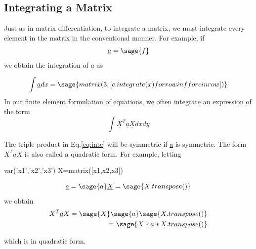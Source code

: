 \documentclass[12pt]{report}
\newcommand{\lab}[1]{
	Eq.\ref{#1}
}
\begin{document}

\subsection{Integrating a Matrix}

Just as in matrix differentiation, to integrate a matrix, we must
integrate every element in the matrix in the conventional manner. For
example, if
$$ \underline{a} = \sage{f}$$
we obtain the integration of $\underline{a}$ as

$$\int \underline{a}dx = \sage{matrix(3,[c.integrate(x) for row in f for c in row ])
}$$
In our finite element formulation of equations, we often integrate an
expression of the form
\begin{equation}
	\int \underline{X}^T\underline{a}\underline{X} dx dy 
	\label{eq:inte}
\end{equation}

The triple product in \lab{eq:inte} will be symmetric 
if \underline{a} is symmetric. The form 
$\underline{X}^T\underline{a}\underline{X}$ is also called
a quadratic form. For
example, letting
\begin{sagesilent}
	var('x1','x2','x3')
	X=matrix([x1,x2,x3])
\end{sagesilent}

$$\underline{a} = \sage{a} \underline{X}= \sage{X.transpose()}$$
we obtain
\begin{align}
	{X}^T\underline{a}{X} = \sage{X}\sage{a}\sage{X.transpose()} \nonumber\\
	=\sage{X*a*X.transpose()}
\end{align}

which is in quadratic form.

\end{document}
